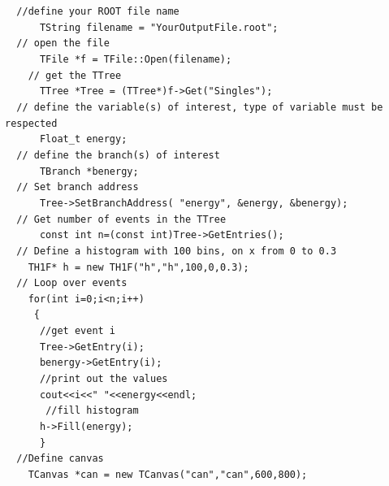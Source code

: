 \documentclass[12pt]{article}
\begin{document}
\verb|  //define your ROOT file name|\\ 
\verb|      TString filename = "YourOutputFile.root";|\\
 
\verb|  // open the file|\\  
\verb|      TFile *f = TFile::Open(filename);|\\
\verb|    // get the TTree|\\  
\verb|      TTree *Tree = (TTree*)f->Get("Singles");|\\

\verb|  // define the variable(s) of interest, type of variable must be respected|\\    
\verb|      Float_t energy;|\\

\verb|  // define the branch(s) of interest|\\    
\verb|      TBranch *benergy;|\\

\verb|  // Set branch address|\\ 
\verb|      Tree->SetBranchAddress( "energy", &energy, &benergy);|\\
   
\verb|  // Get number of events in the TTree|\\
\verb|      const int n=(const int)Tree->GetEntries();|\\

\verb|  // Define a histogram with 100 bins, on x from 0 to 0.3|\\
\verb|    TH1F* h = new TH1F("h","h",100,0,0.3); |\\

\verb|  // Loop over events |\\	   
\verb|    for(int i=0;i<n;i++)|\\
\verb|     {|\\
\verb|      //get event i|\\
\verb|      Tree->GetEntry(i);|\\
\verb|      benergy->GetEntry(i);|\\
\verb|      //print out the values |\\    
\verb|      cout<<i<<" "<<energy<<endl;|\\
\verb|	     //fill histogram|\\
\verb|      h->Fill(energy);|\\	
\verb|      }|\\	

\verb|	//Define canvas|\\
\verb|    TCanvas *can = new TCanvas("can","can",600,800);|\\
\end{document}
